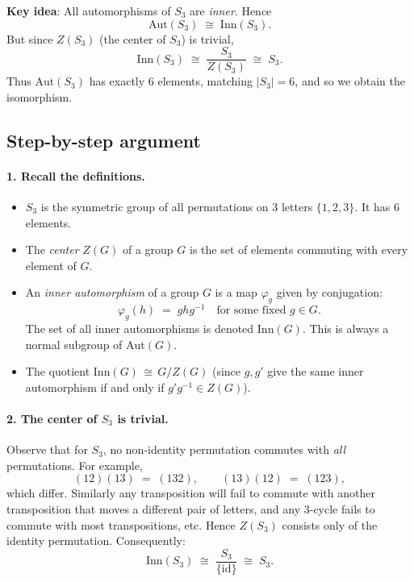 \documentclass[12pt]{article}
\theoremstyle{definition} %
\theoremstyle{plain} %
\begin{document}
\textbf{Key idea}: All automorphisms of $S_3$ are \emph{inner}. Hence
\[
  \mathrm{Aut}(S_3) \;\cong\; \mathrm{Inn}(S_3).
\]
But since $Z(S_3)$ (the center of $S_3$) is trivial,
\[
  \mathrm{Inn}(S_3) \;\cong\; \dfrac{S_3}{Z(S_3)} \;\cong\; S_3.
\]
Thus $\mathrm{Aut}(S_3)$ has exactly 6 elements, matching $|S_3|=6$, and so we obtain the isomorphism.

\subsection*{Step-by-step argument}

\paragraph{1. Recall the definitions.}
\begin{itemize}
  \item $S_3$ is the symmetric group of all permutations on 3 letters $\{1,2,3\}$. It has 6 elements.
  \item The \emph{center} $Z(G)$ of a group $G$ is the set of elements commuting with every element of $G$. 
  \item An \emph{inner automorphism} of a group $G$ is a map $\varphi_g$ given by conjugation:
    \[
      \varphi_g(h) \;=\; g h g^{-1} \quad \text{for some fixed }g \in G.
    \]
    The set of all inner automorphisms is denoted $\mathrm{Inn}(G)$. This is always a normal subgroup of $\mathrm{Aut}(G)$.
  \item The quotient $\mathrm{Inn}(G) \,\cong\, G / Z(G)$ (since $g,g'$ give the same inner automorphism if and only if $g'g^{-1}\in Z(G)$).
\end{itemize}

\paragraph{2. The center of \boldmath$S_3$ is trivial.}
Observe that for $S_3$, no non-identity permutation commutes with \emph{all} permutations. For example,
\[
  (12) (13) \;=\;(132), \quad\quad (13)(12)\;=\;(123),
\]
which differ. Similarly any transposition will fail to commute with another transposition that moves a different pair of letters, and any 3-cycle fails to commute with most transpositions, etc. 
Hence $Z(S_3)$ consists only of the identity permutation. Consequently:
\[
  \mathrm{Inn}(S_3) \;\cong\; \dfrac{S_3}{\{\mathrm{id}\}} \;\cong\; S_3.
\]
\end{document}
